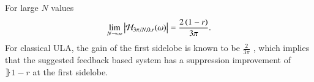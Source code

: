 For large $N$ values 
\begin{equation*}
    \lim_{N\rightarrow\infty}\left\vert\mathcal{H}_{3\pi/N,0,r}(\omega)\right\vert=\frac{
    2\left({1-r}\right)
    }{
    3\pi
    }.
\end{equation*}
\ifdefined\showDev
\else
\fi
For classical ULA, the gain of the first sidelobe is known to be $\frac{2}{3\pi}$ \cite{VanTrees2002DetectionIV}, which implies that the suggested feedback based system has a suppression improvement of $\rBrace{1-r}$ at the first sidelobe.

